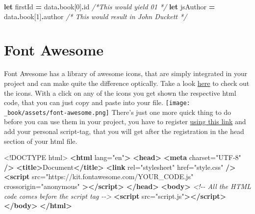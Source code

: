 \documentclass[
]{book}
\newenvironment{Shaded}{\begin{snugshade}}{\end{snugshade}}
\newcommand{\AttributeTok}[1]{\textcolor[rgb]{0.77,0.63,0.00}{#1}}
\newcommand{\CommentTok}[1]{\textcolor[rgb]{0.56,0.35,0.01}{\textit{#1}}}
\newcommand{\DataTypeTok}[1]{\textcolor[rgb]{0.13,0.29,0.53}{#1}}
\newcommand{\DecValTok}[1]{\textcolor[rgb]{0.00,0.00,0.81}{#1}}
\newcommand{\KeywordTok}[1]{\textcolor[rgb]{0.13,0.29,0.53}{\textbf{#1}}}
\newcommand{\NormalTok}[1]{#1}
\newcommand{\OperatorTok}[1]{\textcolor[rgb]{0.81,0.36,0.00}{\textbf{#1}}}
\newcommand{\OtherTok}[1]{\textcolor[rgb]{0.56,0.35,0.01}{#1}}
\newcommand{\StringTok}[1]{\textcolor[rgb]{0.31,0.60,0.02}{#1}}
\begin{document}
\begin{Shaded}
\begin{Highlighting}[]
\KeywordTok{let}\NormalTok{ firstId }\OperatorTok{=}\NormalTok{ data}\OperatorTok{.}\AttributeTok{book}\NormalTok{[}\DecValTok{0}\NormalTok{]}\OperatorTok{.}\AttributeTok{id} \CommentTok{/*This would yield 01 */}
\KeywordTok{let}\NormalTok{ jsAuthor }\OperatorTok{=}\NormalTok{ data}\OperatorTok{.}\AttributeTok{book}\NormalTok{[}\DecValTok{1}\NormalTok{]}\OperatorTok{.}\AttributeTok{author} \CommentTok{/* This would result in John Duckett */}  
\end{Highlighting}
\end{Shaded}

\hypertarget{font-awesome}{%
\section{Font Awesome}\label{font-awesome}}

Font Awesome has a library of awesome icons, that are simply integrated in your project and can make quite the difference optically.
Take a look \href{https://fontawesome.com/search?m=free}{here} to check out the icons. With a click on any of the icons you get shown the respective html code, that you can just copy and paste into your file.
\texttt{[image: \_book/assets/font-awesome.png]}
There's just one more quick thing to do before you can use them in your project, you have to register \href{https://fontawesome.com/v6/docs/web/setup/get-started}{using this link} and add your personal script-tag, that you will get after the registration in the head section of your html file.

\begin{Shaded}
\begin{Highlighting}[]
\DataTypeTok{\textless{}!DOCTYPE }\NormalTok{html}\DataTypeTok{\textgreater{}}
\KeywordTok{\textless{}html}\OtherTok{ lang=}\StringTok{"en"}\KeywordTok{\textgreater{}}
  \KeywordTok{\textless{}head\textgreater{}}
    \KeywordTok{\textless{}meta}\OtherTok{ charset=}\StringTok{"UTF{-}8"} \KeywordTok{/\textgreater{}}
    \KeywordTok{\textless{}title\textgreater{}}\NormalTok{Document}\KeywordTok{\textless{}/title\textgreater{}}
    \KeywordTok{\textless{}link}\OtherTok{ rel=}\StringTok{"stylesheet"}\OtherTok{ href=}\StringTok{"style.css"} \KeywordTok{/\textgreater{}}
    \KeywordTok{\textless{}script}
\OtherTok{      src=}\StringTok{"https://kit.fontawesome.com/YOUR\_CODE.js"}
\OtherTok{      crossorigin=}\StringTok{"anonymous"}
    \KeywordTok{\textgreater{}\textless{}/script\textgreater{}}
  \KeywordTok{\textless{}/head\textgreater{}}
  \KeywordTok{\textless{}body\textgreater{}}
    \CommentTok{\textless{}!{-}{-} All the HTML code comes before the script tag {-}{-}\textgreater{}}
    \KeywordTok{\textless{}script}\OtherTok{ src=}\StringTok{"script.js"}\KeywordTok{\textgreater{}\textless{}/script\textgreater{}}
  \KeywordTok{\textless{}/body\textgreater{}}
\KeywordTok{\textless{}/html\textgreater{}}
\end{Highlighting}
\end{Shaded}


  
\end{document}
